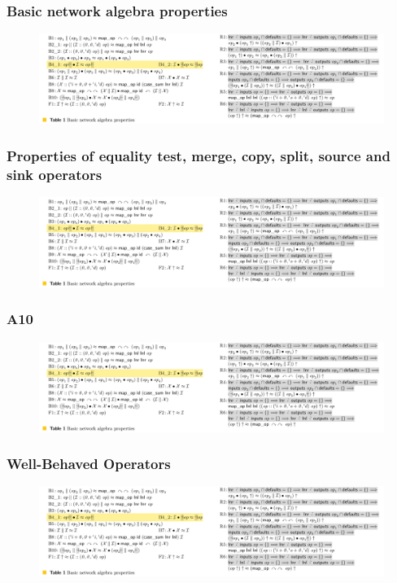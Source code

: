 \documentclass[fleqn,aspectratio=169,10pt]{beamer}
\begin{document}
\begin{frame}
  \frametitle{Basic network algebra properties}
  \begin{figure}
    \centering
    \includegraphics[width=1\textwidth]{table_1_3.png}
  \end{figure}
\end{frame}

\begin{frame}[fragile]
  \frametitle{Properties of equality test, merge, copy, split, source and sink operators}
  \begin{figure}
    \centering
    \includegraphics[width=1\textwidth]{table_1_3.png}
  \end{figure}
\end{frame}

\begin{frame}[fragile]
  \frametitle{A10}
  \begin{figure}
    \centering
    \includegraphics[width=1\textwidth]{table_1_3.png}
  \end{figure}
\end{frame}

\begin{frame}[fragile]
  \frametitle{Well-Behaved Operators}
  \begin{figure}
    \centering
    \includegraphics[width=1\textwidth]{table_1_3.png}
  \end{figure}
\end{frame}
\end{document}
